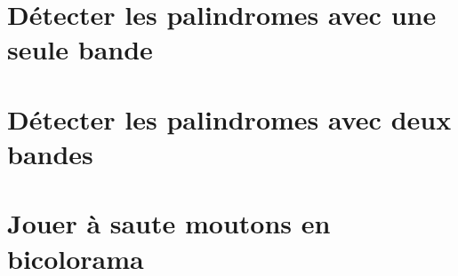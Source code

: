 \documentclass[a4paper, 12pt]{scrartcl}
\begin{document}
	


\newpage
\section{Détecter les palindromes avec une seule bande}

	



\newpage
\section{Détecter les palindromes avec deux bandes}

	


\newpage
\section{Jouer à saute moutons en bicolorama}

	
\end{document}
